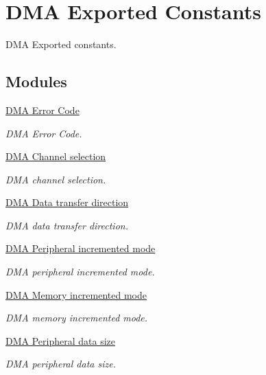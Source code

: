 \hypertarget{group___d_m_a___exported___constants}{}\section{D\+MA Exported Constants}
\label{group___d_m_a___exported___constants}


D\+MA Exported constants.  


\subsection*{Modules}
\begin{DoxyCompactItemize}
\item 
\hyperlink{group___d_m_a___error___code}{D\+M\+A Error Code}
\begin{DoxyCompactList}\small\item\em D\+MA Error Code. \end{DoxyCompactList}\item 
\hyperlink{group___d_m_a___channel__selection}{D\+M\+A Channel selection}
\begin{DoxyCompactList}\small\item\em D\+MA channel selection. \end{DoxyCompactList}\item 
\hyperlink{group___d_m_a___data__transfer__direction}{D\+M\+A Data transfer direction}
\begin{DoxyCompactList}\small\item\em D\+MA data transfer direction. \end{DoxyCompactList}\item 
\hyperlink{group___d_m_a___peripheral__incremented__mode}{D\+M\+A Peripheral incremented mode}
\begin{DoxyCompactList}\small\item\em D\+MA peripheral incremented mode. \end{DoxyCompactList}\item 
\hyperlink{group___d_m_a___memory__incremented__mode}{D\+M\+A Memory incremented mode}
\begin{DoxyCompactList}\small\item\em D\+MA memory incremented mode. \end{DoxyCompactList}\item 
\hyperlink{group___d_m_a___peripheral__data__size}{D\+M\+A Peripheral data size}
\begin{DoxyCompactList}\small\item\em D\+MA peripheral data size. \end{DoxyCompactList}\item 

\end{DoxyCompactItemize}
